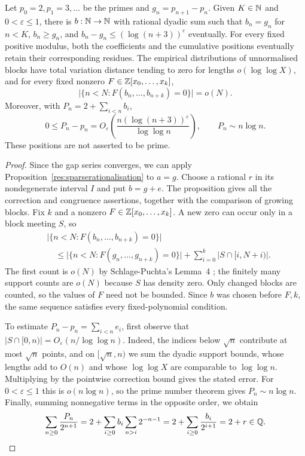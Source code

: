 \documentclass[11pt]{article}
\begin{document}
\begin{corollary}\label{res:jointcountermodel}
Let $p_0=2,p_1=3,\ldots$ be the primes and $g_n=p_{n+1}-p_n$.
Given $K\in\mathbb{N}$ and $0<\varepsilon\le1$, there is $b:\mathbb{N}\to\mathbb{N}$ with
rational dyadic sum such that $b_n=g_n$ for $n<K$, $b_n\ge g_n$, and
$b_n-g_n\le(\log(n+3))^\varepsilon$ eventually.  For every fixed positive
modulus, both the coefficients and the cumulative positions eventually
retain their corresponding residues.  The empirical distributions of
unnormalised blocks have total variation distance tending to zero
for lengths $o(\log\log X)$, and for every fixed nonzero
$F\in\mathbb{Z}[x_0,\ldots,x_k]$,
\[
 \bigl|\{n<N:F(b_n,\ldots,b_{n+k})=0\}\bigr|=o(N).
\]
Moreover, with $P_n=2+\sum_{i<n}b_i$,
\[
 0\le P_n-p_n=O_\varepsilon\!\left(
       \frac{n(\log(n+3))^\varepsilon}{\log\log n}\right),
 \qquad P_n\sim n\log n.
\]
These positions are not asserted to be prime.
\end{corollary}

\begin{proof}
Since the gap series converges, we can apply
Proposition~\ref{res:sparserationalisation} to $a=g$.  Choose a rational
$r$ in its nondegenerate interval $I$ and put $b=g+e$.
The proposition gives all the correction and congruence assertions,
together with the comparison of growing blocks.
Fix $k$ and a nonzero $F\in\mathbb{Z}[x_0,\ldots,x_k]$.  A new zero can occur
only in a block meeting $S$, so
\[
 \begin{aligned}
 &\bigl|\{n<N:F(b_n,\ldots,b_{n+k})=0\}\bigr|\\
 &\quad\le\bigl|\{n<N:F(g_n,\ldots,g_{n+k})=0\}\bigr|
       +\sum_{i=0}^k|S\cap[i,N+i)|.
 \end{aligned}
\]
The first count is $o(N)$ by Schlage-Puchta's Lemma~4
\cite{schlagepuchta2011}; the finitely many support counts are $o(N)$
because $S$ has density zero.  Only changed blocks are counted, so the
values of $F$ need not be bounded.  Since $b$ was chosen before $F,k$,
the same sequence satisfies every fixed-polynomial condition.

To estimate $P_n-p_n=\sum_{i<n}e_i$, first observe that
$|S\cap[0,n)|=O_\varepsilon(n/\log\log n)$.  Indeed, the indices below
$\sqrt n$ contribute at most $\sqrt n$ points, and on $[\sqrt n,n)$ we
sum the dyadic support bounds, whose lengths add to $O(n)$ and whose
$\log\log X$ are comparable to $\log\log n$.  Multiplying by the
pointwise correction bound gives the stated error.  For
$0<\varepsilon\le1$ this is $o(n\log n)$, so the prime number theorem
\cite[Chapter~6]{mv2007} gives $P_n\sim n\log n$.  Finally, summing
nonnegative terms in the opposite order, we obtain
\[
 \sum_{n\ge0}\frac{P_n}{2^{n+1}}
 =2+\sum_{i\ge0}b_i\sum_{n>i}2^{-n-1}
 =2+\sum_{i\ge0}\frac{b_i}{2^{i+1}}=2+r\in\mathbb{Q}.
\]
\end{proof}
\end{document}
